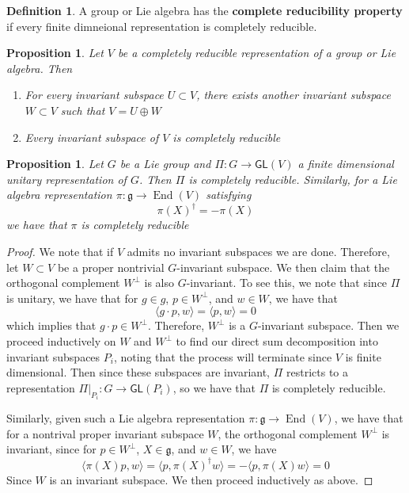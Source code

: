 \documentclass[psamsfonts]{amsart}
\newtheorem{prop}[thm]{Proposition}
\theoremstyle{definition}
\newtheorem{defn}[thm]{Definition}
\theoremstyle{remark}
\newcommand{\GL}{\mathsf{GL}}
\newcommand{\g}{\mathfrak{g}}
\DeclareMathOperator{\End}{End}
\begin{document}
\begin{defn}
A group or Lie algebra has the \textbf{complete reducibility property} if every finite dimneional representation is completely reducible.
\end{defn}

\begin{prop}
Let $V$ be a completely reducible representation of a group or Lie algebra. Then
\begin{enumerate}
\item For every invariant subspace $U \subset V$, there exists another invariant subspace $W \subset V$ such that $V = U \oplus W$
\item Every invariant subspace of $V$ is completely reducible
\end{enumerate}
\end{prop}

\begin{prop}
Let $G$ be a Lie group and $\Pi:G \to \GL(V)$ a finite dimensional unitary representation of $G$. Then $\Pi$ is completely reducible. Similarly, for a Lie algebra representation $\pi:\g \to \End(V)$ satisfying
$$\pi(X)^\dagger= -\pi(X) $$
we have that $\pi$ is completely reducible
\end{prop}

\begin{proof}
We note that if $V$ admits no invariant subspaces we are done. Therefore, let $W \subset V$ be a proper nontrivial $G$-invariant subspace. We then claim that the orthogonal complement $W^\perp$ is also $G$-invariant. To see this, we note that since $\Pi$ is unitary, we have that for $g \in g$, $p \in W^\perp$, and $w\in W$, we have that 
$$\langle g\cdot p, w\rangle = \langle p, w \rangle = 0 $$
which implies that $g \cdot p \in W^\perp$. Therefore, $W^\perp$ is a $G$-invariant subspace.
Then we proceed inductively on $W$ and $W^\perp$ to find our direct sum decomposition into invariant subspaces $P_i$, noting that the process will terminate since $V$ is finite dimensional. Then since these subspaces are invariant, $\Pi$ restricts to a representation $\Pi\vert_{P_i}: G \to \GL(P_i)$, so we have that $\Pi$ is completely reducible.

Similarly, given such a Lie algebra representation $\pi: \g \to \End(V)$, we have that for a nontrival proper invariant subspace $W$, the orthogonal complement $W^\perp$ is invariant, since for $p \in W^\perp$, $X \in \g$, and $w \in W$, we have
$$\langle\pi(X)p, w \rangle = \langle p, \pi(X)^\dagger w \rangle = - \langle p, \pi(X)w\rangle = 0 $$
Since $W$ is an invariant subspace. We then proceed inductively as above.
\end{proof}
\end{document}
